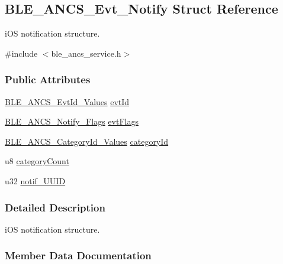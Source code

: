 \hypertarget{struct_b_l_e___a_n_c_s___evt___notify}{}\subsection{B\+L\+E\+\_\+\+A\+N\+C\+S\+\_\+\+Evt\+\_\+\+Notify Struct Reference}
\label{struct_b_l_e___a_n_c_s___evt___notify}


i\+OS notification structure.  




{\ttfamily \#include $<$ble\+\_\+ancs\+\_\+service.\+h$>$}

\subsubsection*{Public Attributes}
\begin{DoxyCompactItemize}
\item 
\hyperlink{group___b_l_e___a_n_c_s_gaf8fe466493239548694a1a439f5b8bc0}{B\+L\+E\+\_\+\+A\+N\+C\+S\+\_\+\+Evt\+Id\+\_\+\+Values} \hyperlink{struct_b_l_e___a_n_c_s___evt___notify_ab305cddebbb9a48f8b1c801e8061f062}{evt\+Id}
\item 
\hyperlink{struct_b_l_e___a_n_c_s___notify___flags}{B\+L\+E\+\_\+\+A\+N\+C\+S\+\_\+\+Notify\+\_\+\+Flags} \hyperlink{struct_b_l_e___a_n_c_s___evt___notify_a1e6bcdb7cc9e01b6f5d6b500488fdbc7}{evt\+Flags}
\item 
\hyperlink{group___b_l_e___a_n_c_s_ga982bbd8a00c6ecff960d5196576dbba0}{B\+L\+E\+\_\+\+A\+N\+C\+S\+\_\+\+Category\+Id\+\_\+\+Values} \hyperlink{struct_b_l_e___a_n_c_s___evt___notify_a822feaaaeffd80d8abcc0656714b371a}{category\+Id}
\item 
u8 \hyperlink{struct_b_l_e___a_n_c_s___evt___notify_ac144c76d5e403f456b52a470b3cd543e}{category\+Count}
\item 
u32 \hyperlink{struct_b_l_e___a_n_c_s___evt___notify_aa89f38914f91f6dcafffde27ef802ae1}{notif\+\_\+\+U\+U\+ID}
\end{DoxyCompactItemize}


\subsubsection{Detailed Description}
i\+OS notification structure. 

\subsubsection{Member Data Documentation}
